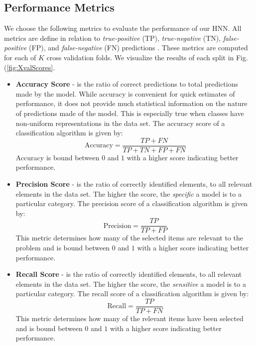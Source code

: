 \documentclass[conference,onecolumn,letterpaper]{IEEEtran}
\begin{document}

\subsection{Performance Metrics}
\label{subsec:Metrics}

We choose the following metrics to evaluate the performance of our HNN. All metrics are define in relation to \textit{true-positive} (TP), \textit{true-negative} (TN), \textit{false-positive} (FP), and \textit{false-negative} (FN) predictions \cite{Geron,James}. These metrics are computed for each of $K$ cross validation folds. We visualize the results of each split in Fig.(\ref{fig:XvalScores}.

\begin{itemize}
    \item \textbf{Accuracy Score} - is the ratio of correct predictions to total predictions made by the model. While accuracy is convenient for quick estimates of performance, it does not provide much statistical information on the nature of predictions made of the model. This is especially true when classes have non-uniform representations in the data set. The accuracy score of a classification algorithm is given by:
    \begin{equation}
        \text{Accuracy} = \frac{TP + FN}{TP + TN + FP + FN}
    \end{equation}
    Accuracy is bound between $0$ and $1$ with a higher score indicating better performance.
    
    \item \textbf{Precision Score} - is the ratio of correctly identified elements, to all relevant elements in the data set. The higher the score, the \textit{specific} a model is to a particular category. The precision score of a classification algorithm is given by:
    \begin{equation}
        \text{Precision} = \frac{TP}{TP + FP}
    \end{equation}
    This metric determines how many of the selected items are relevant to the problem and is bound between $0$ and $1$ with a higher score indicating better performance.
    
    \item \textbf{Recall Score} - is the ratio of correctly identified elements, to all relevant elements in the data set. The higher the score, the \textit{sensitive} a model is to a particular category. The recall score of a classification algorithm is given by:
    \begin{equation}
        \text{Recall} = \frac{TP}{TP + FN}
    \end{equation}
    This metric determines how many of the relevant items have been selected and is bound between $0$ and $1$ with a higher score indicating better performance.
    

\end{itemize}
\end{document}

